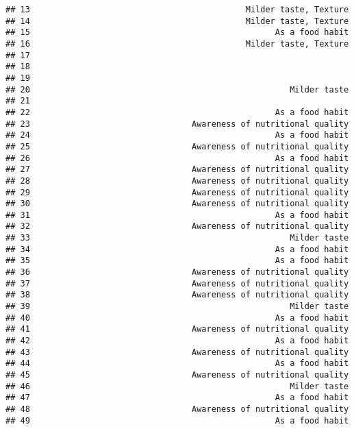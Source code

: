 \documentclass[
]{article}
\begin{document}
\begin{verbatim}
## 13                                            Milder taste, Texture
## 14                                            Milder taste, Texture
## 15                                                  As a food habit
## 16                                            Milder taste, Texture
## 17                                                                 
## 18                                                                 
## 19                                                                 
## 20                                                     Milder taste
## 21                                                                 
## 22                                                  As a food habit
## 23                                 Awareness of nutritional quality
## 24                                                  As a food habit
## 25                                 Awareness of nutritional quality
## 26                                                  As a food habit
## 27                                 Awareness of nutritional quality
## 28                                 Awareness of nutritional quality
## 29                                 Awareness of nutritional quality
## 30                                 Awareness of nutritional quality
## 31                                                  As a food habit
## 32                                 Awareness of nutritional quality
## 33                                                     Milder taste
## 34                                                  As a food habit
## 35                                                  As a food habit
## 36                                 Awareness of nutritional quality
## 37                                 Awareness of nutritional quality
## 38                                 Awareness of nutritional quality
## 39                                                     Milder taste
## 40                                                  As a food habit
## 41                                 Awareness of nutritional quality
## 42                                                  As a food habit
## 43                                 Awareness of nutritional quality
## 44                                                  As a food habit
## 45                                 Awareness of nutritional quality
## 46                                                     Milder taste
## 47                                                  As a food habit
## 48                                 Awareness of nutritional quality
## 49                                                  As a food habit

\end{verbatim}
\end{document}
